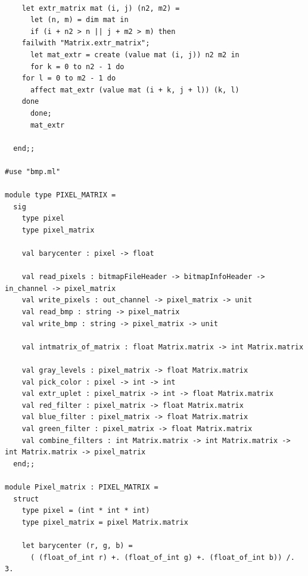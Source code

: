 \documentclass[a4paper,10pt]{report}
\theoremstyle{break}
\begin{document}
    \begin{lstlisting}

    let extr_matrix mat (i, j) (n2, m2) =
      let (n, m) = dim mat in
      if (i + n2 > n || j + m2 > m) then
	failwith "Matrix.extr_matrix";
      let mat_extr = create (value mat (i, j)) n2 m2 in
      for k = 0 to n2 - 1 do
	for l = 0 to m2 - 1 do
	  affect mat_extr (value mat (i + k, j + l)) (k, l)
	done
      done;
      mat_extr

  end;;

#use "bmp.ml"

module type PIXEL_MATRIX =
  sig
    type pixel
    type pixel_matrix
	
    val barycenter : pixel -> float

    val read_pixels : bitmapFileHeader -> bitmapInfoHeader -> in_channel -> pixel_matrix
    val write_pixels : out_channel -> pixel_matrix -> unit
    val read_bmp : string -> pixel_matrix
    val write_bmp : string -> pixel_matrix -> unit

    val intmatrix_of_matrix : float Matrix.matrix -> int Matrix.matrix

    val gray_levels : pixel_matrix -> float Matrix.matrix
    val pick_color : pixel -> int -> int
    val extr_uplet : pixel_matrix -> int -> float Matrix.matrix
    val red_filter : pixel_matrix -> float Matrix.matrix
    val blue_filter : pixel_matrix -> float Matrix.matrix
    val green_filter : pixel_matrix -> float Matrix.matrix
    val combine_filters : int Matrix.matrix -> int Matrix.matrix -> int Matrix.matrix -> pixel_matrix
  end;;

module Pixel_matrix : PIXEL_MATRIX =
  struct
    type pixel = (int * int * int)
    type pixel_matrix = pixel Matrix.matrix

    let barycenter (r, g, b) =
      ( (float_of_int r) +. (float_of_int g) +. (float_of_int b)) /. 3.
	
    \end{lstlisting}
\newpage
\end{document}

